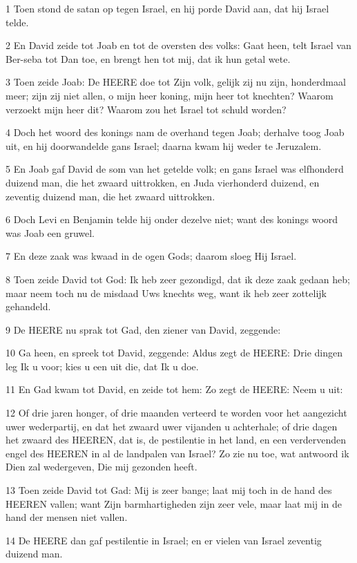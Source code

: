 \par 1 Toen stond de satan op tegen Israel, en hij porde David aan, dat hij Israel telde.
\par 2 En David zeide tot Joab en tot de oversten des volks: Gaat heen, telt Israel van Ber-seba tot Dan toe, en brengt hen tot mij, dat ik hun getal wete.
\par 3 Toen zeide Joab: De HEERE doe tot Zijn volk, gelijk zij nu zijn, honderdmaal meer; zijn zij niet allen, o mijn heer koning, mijn heer tot knechten? Waarom verzoekt mijn heer dit? Waarom zou het Israel tot schuld worden?
\par 4 Doch het woord des konings nam de overhand tegen Joab; derhalve toog Joab uit, en hij doorwandelde gans Israel; daarna kwam hij weder te Jeruzalem.
\par 5 En Joab gaf David de som van het getelde volk; en gans Israel was elfhonderd duizend man, die het zwaard uittrokken, en Juda vierhonderd duizend, en zeventig duizend man, die het zwaard uittrokken.
\par 6 Doch Levi en Benjamin telde hij onder dezelve niet; want des konings woord was Joab een gruwel.
\par 7 En deze zaak was kwaad in de ogen Gods; daarom sloeg Hij Israel.
\par 8 Toen zeide David tot God: Ik heb zeer gezondigd, dat ik deze zaak gedaan heb; maar neem toch nu de misdaad Uws knechts weg, want ik heb zeer zottelijk gehandeld.
\par 9 De HEERE nu sprak tot Gad, den ziener van David, zeggende:
\par 10 Ga heen, en spreek tot David, zeggende: Aldus zegt de HEERE: Drie dingen leg Ik u voor; kies u een uit die, dat Ik u doe.
\par 11 En Gad kwam tot David, en zeide tot hem: Zo zegt de HEERE: Neem u uit:
\par 12 Of drie jaren honger, of drie maanden verteerd te worden voor het aangezicht uwer wederpartij, en dat het zwaard uwer vijanden u achterhale; of drie dagen het zwaard des HEEREN, dat is, de pestilentie in het land, en een verdervenden engel des HEEREN in al de landpalen van Israel? Zo zie nu toe, wat antwoord ik Dien zal wedergeven, Die mij gezonden heeft.
\par 13 Toen zeide David tot Gad: Mij is zeer bange; laat mij toch in de hand des HEEREN vallen; want Zijn barmhartigheden zijn zeer vele, maar laat mij in de hand der mensen niet vallen.
\par 14 De HEERE dan gaf pestilentie in Israel; en er vielen van Israel zeventig duizend man.

